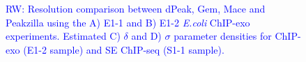 \documentclass{bmcart}
\newcommand{\RW}[1]{\textcolor{blue}{RW: #1}}
\begin{document}
\begin{figure}[h!]
   \caption{\RW{Resolution comparison between dPeak, Gem, Mace and
       Peakzilla using the A) E1-1 and B) E1-2 \textit{E.coli}
       ChIP-exo experiments. Estimated C) $\delta$ and D) $\sigma$
       parameter densities for ChIP-exo (E1-2 sample) and SE ChIP-seq
       (S1-1 sample).}}
  \label{fig:6}
\end{figure}

\newpage

\end{document}
